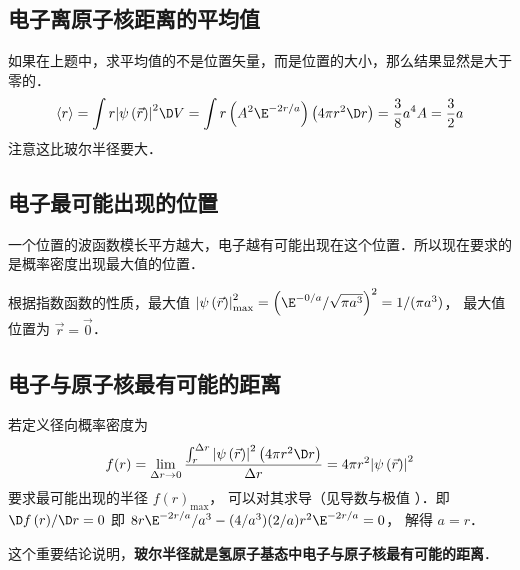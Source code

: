 \subsection{电子离原子核距离的平均值}

如果在上题中，求平均值的不是位置矢量，而是位置的大小，那么结果显然是大于零的．
\begin{equation}
 \left\langle r \right\rangle = \int {r{{\left| {\psi \left( {\vec r} \right)} \right|}^2} \D V} = \int {r \left(A^2 \E^{-2r/a}\right)\left( {4\pi {r^2} \D r} \right)}= \frac{3}{8}{a^4}A = \frac{3}{2}a
\end{equation}
注意这比玻尔半径要大．

\subsection{电子最可能出现的位置}

 一个位置的波函数模长平方越大，电子越有可能出现在这个位置．所以现在要求的是概率密度出现最大值的位置．
 
 根据指数函数的性质，最大值 $\left| {\psi \left( {\vec r} \right)} \right|_{\max }^2 ={\left( {\E^{-0/a}}/{{\sqrt {\pi {a^3}} }} \right)^2} = {1}/({{\pi {a^3}}})$， 最大值位置为 $\vec r = \vec 0$． 

\subsection{电子与原子核最有可能的距离}
若定义径向概率密度为
\begin{equation}
f(r) = \lim_{\Delta r \to 0} \frac{{\int_r^{\Delta r} {{{\left| {\psi \left( {\vec r} \right)} \right|}^2}\left( {4\pi {r^2} \D r} \right)} }}{{\Delta r}} = 4\pi {r^2}{\left| {\psi \left( {\vec r} \right)} \right|^2}
  \end{equation}
  要求最可能出现的半径 $f{\left( r \right)_{\max }}$，  可以对其求导（见导数与极值%
  ）．即 ${{ \D f\left( r \right)}}/{{ \D r}} = 0$ 即 ${8 r{\E^{-2r/a}}}/{{{a^3}}} - ({4}/{{{a^3}}})({2}/{a}){r^2}{\E^{-2r/a}} = 0$， 解得 $a = r$． 
 
这个重要结论说明，\textbf{玻尔半径就是氢原子基态中电子与原子核最有可能的距离}．
